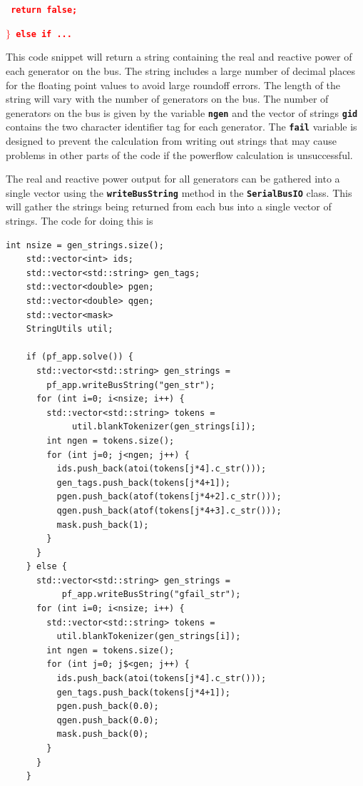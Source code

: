 \documentclass[12pt]{report} %
\begin{document}
\textcolor{red}{\texttt{\textbf{  return false;}}}

\textcolor{red}{\texttt{\textbf{$\boldsymbol{\mathrm{\}}}$ else if ...}}}

\textcolor{red}{\texttt{\textbf{}}}

This code snippet will return a string containing the real and reactive power of each generator on the bus. The string includes a large number of decimal places for the floating point values to avoid large roundoff errors. The length of the string will vary with the number of generators on the bus. The number of generators on the bus is given by the variable \texttt{\textbf{ngen}} and the vector of strings \texttt{\textbf{gid}} contains the two character identifier tag for each generator. The \texttt{\textbf{fail}} variable is designed to prevent the calculation from writing out strings that may cause problems in other parts of the code if the powerflow calculation is unsuccessful.

The real and reactive power output for all generators can be gathered into a single vector using the \texttt{\textbf{writeBusString}} method in the \texttt{\textbf{SerialBusIO}} class. This will gather the strings being returned from each bus into a single vector of strings. The code for doing this is

{
\color{red}
\begin{Verbatim}[fontseries=b]
    int nsize = gen_strings.size();
    std::vector<int> ids;
    std::vector<std::string> gen_tags;
    std::vector<double> pgen;
    std::vector<double> qgen;
    std::vector<mask>
    StringUtils util;

    if (pf_app.solve()) {
      std::vector<std::string> gen_strings =
        pf_app.writeBusString("gen_str");
      for (int i=0; i<nsize; i++) {
        std::vector<std::string> tokens =
             util.blankTokenizer(gen_strings[i]);
        int ngen = tokens.size();
        for (int j=0; j<ngen; j++) {
          ids.push_back(atoi(tokens[j*4].c_str()));
          gen_tags.push_back(tokens[j*4+1]);
          pgen.push_back(atof(tokens[j*4+2].c_str()));
          qgen.push_back(atof(tokens[j*4+3].c_str()));
          mask.push_back(1);
        }
      }
    } else {
      std::vector<std::string> gen_strings =
           pf_app.writeBusString("gfail_str");
      for (int i=0; i<nsize; i++) {
        std::vector<std::string> tokens =
          util.blankTokenizer(gen_strings[i]);
        int ngen = tokens.size();
        for (int j=0; j$<gen; j++) {
          ids.push_back(atoi(tokens[j*4].c_str()));
          gen_tags.push_back(tokens[j*4+1]);
          pgen.push_back(0.0);
          qgen.push_back(0.0);
          mask.push_back(0);
        }
      }
    }
\end{Verbatim}
}
\end{document}

